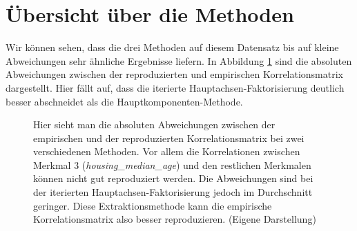 \section{Übersicht über die Methoden}
\label{sec:Übersicht}
	Wir können sehen, dass die drei Methoden auf diesem Datensatz bis auf kleine Abweichungen sehr ähnliche Ergebnisse liefern.
	In Abbildung \ref{fig:Residualmatrizen} sind die absoluten Abweichungen zwischen der reproduzierten und empirischen Korrelationsmatrix dargestellt. Hier fällt auf, dass die iterierte Hauptachsen-Faktorisierung deutlich besser abschneidet als die Hauptkomponenten-Methode.
	\begin{figure}[h]
		
		\caption[(Absolute) Residualmatrizen als Heatmap]{Hier sieht man die absoluten Abweichungen zwischen der empirischen und der reproduzierten Korrelationsmatrix bei zwei verschiedenen Methoden. Vor allem die Korrelationen zwischen Merkmal 3 (\textit{housing\_median\_age}) und
			den restlichen Merkmalen können nicht gut reproduziert werden. Die Abweichungen sind bei der iterierten Hauptachsen-Faktorisierung
			jedoch im Durchschnitt geringer. Diese Extraktionsmethode kann die empirische Korrelationsmatrix also besser reproduzieren.
			(Eigene Darstellung)}
		\label{fig:Residualmatrizen}
	\end{figure}
	
